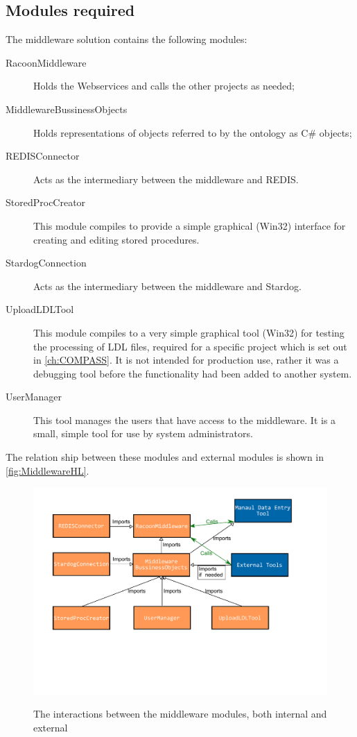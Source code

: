 \subsection{Modules required}
The middleware solution contains the following modules:

\begin{description}
    \item[RacoonMiddleware] Holds the Webservices and calls the other projects as needed;
    \item[MiddlewareBussinessObjects] Holds representations of objects referred to by the ontology as C\# objects;     
    \item[REDISConnector] Acts as the intermediary between the middleware and REDIS.
    \item[StoredProcCreator]
    This module compiles to provide a simple graphical (Win32) interface for creating and editing stored procedures. 
    \item[StardogConnection]  Acts as the intermediary between the middleware and Stardog.    
    \item[UploadLDLTool]
    This module compiles to a very simple graphical tool (Win32) for testing the processing of LDL files, required for a specific project which is set out in  \autoref{ch:COMPASS}. It is not intended for production use, rather it was a debugging tool before the functionality had been added to another system.
    \item[UserManager]
    This tool manages the users that have access to the middleware. It is a small, simple tool for use by system administrators.
\end{description}

The relation ship between these modules and external modules is shown in \autoref{fig:MiddlewareHL}.

 \begin{figure}[ht]
\myfloatalign
{\includegraphics[width=\linewidth]{gfx/MiddlewareHighLevel}} 
\caption{The interactions between the middleware modules, both internal and external}
\label{fig:MiddlewareHL}
\end{figure}
 

